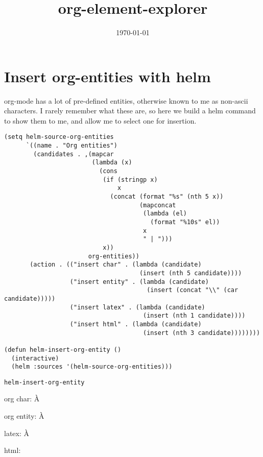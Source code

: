\documentclass[11pt]{article}
\date{\today}
\title{org-element-explorer}
\begin{document}
\section{Insert org-entities with helm}
\label{sec-1}
org-mode has a lot of pre-defined entities, otherwise known to me as non-ascii characters. I rarely remember what these are, so here we build a helm command to show them to me, and allow me to select one for insertion.

\begin{verbatim}
(setq helm-source-org-entities
      `((name . "Org entities")
        (candidates . ,(mapcar
                        (lambda (x)
                          (cons
                           (if (stringp x)
                               x
                             (concat (format "%s" (nth 5 x))
                                     (mapconcat
                                      (lambda (el)
                                        (format "%10s" el))
                                      x
                                      " | ")))
                           x))
                       org-entities))
       (action . (("insert char" . (lambda (candidate)
                                     (insert (nth 5 candidate))))
                  ("insert entity" . (lambda (candidate)
                                       (insert (concat "\\" (car candidate)))))
                  ("insert latex" . (lambda (candidate)
                                      (insert (nth 1 candidate))))
                  ("insert html" . (lambda (candidate)
                                      (insert (nth 3 candidate))))))))

(defun helm-insert-org-entity ()
  (interactive)
  (helm :sources '(helm-source-org-entities)))
\end{verbatim}

\begin{verbatim}
helm-insert-org-entity
\end{verbatim}

org char: À

org entity: \`{A}

latex: \`{A}

html:
\end{document}
